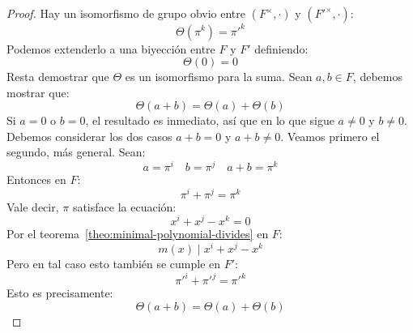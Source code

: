 \begin{proof}
    Hay un isomorfismo de grupo obvio%
    entre \((F^\times, \cdot)\) y \((F'^\times, \cdot)\):
    \begin{equation*}
      \Theta(\pi^k)
	= \pi'^k
    \end{equation*}
    Podemos extenderlo a una biyección entre \(F\) y \(F'\)
    definiendo:
    \begin{equation*}
      \Theta(0)
	= 0
    \end{equation*}
    Resta demostrar que \(\Theta\) es un isomorfismo para la suma.
    Sean \(a, b \in F\),
    debemos mostrar que:
    \begin{equation*}
      \Theta(a + b)
	= \Theta(a) + \Theta(b)
    \end{equation*}
    Si \(a = 0\) o \(b = 0\),
    el resultado es inmediato,
    así que en lo que sigue \(a \ne 0\) y \(b \ne 0\).
    Debemos considerar los dos casos \(a + b = 0\)
    y \(a + b \ne 0\).
    Veamos primero el segundo,
    más general.
    Sean:
    \begin{equation*}
      a = \pi^i \quad b = \pi^j \quad a + b = \pi^k
    \end{equation*}
    Entonces en \(F\):
    \begin{equation*}
      \pi^i + \pi^j
	= \pi^k
    \end{equation*}
    Vale decir,
    \(\pi\) satisface la ecuación:
    \begin{equation*}
      x^i + x^j - x^k
	= 0
    \end{equation*}
    Por el teorema~\ref{theo:minimal-polynomial-divides}
    en \(F\):
    \begin{equation*}
      m(x) \mid x^i + x^j - x^k
    \end{equation*}
    Pero en tal caso esto también se cumple en \(F'\):
    \begin{equation*}
      \pi'^i + \pi'^j
	= \pi'^k
    \end{equation*}
    Esto es precisamente:
    \begin{equation*}
      \Theta(a + b)
	= \Theta(a) + \Theta(b)
    \end{equation*}


\end{proof}
